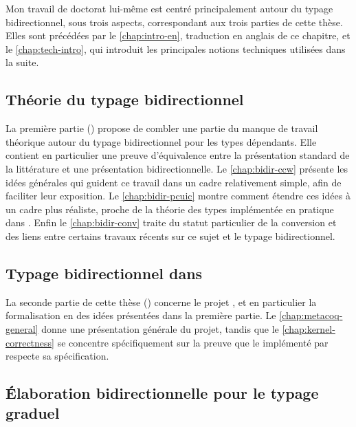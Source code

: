 Mon travail de doctorat lui-même
est centré principalement autour du typage bidirectionnel, sous
trois aspects, correspondant aux trois parties de cette thèse.
Elles sont précédées par le \cref{chap:intro-en}, traduction en anglais
de ce chapitre, et le \cref{chap:tech-intro}, qui introduit les principales
notions techniques utilisées dans la suite.

\subsection{Théorie du typage bidirectionnel}

La première partie () propose de combler une partie du
manque de travail théorique autour du typage bidirectionnel pour les types dépendants.
Elle contient en particulier une
preuve d’équivalence entre la présentation standard de la littérature
et une présentation bidirectionnelle.
Le \cref{chap:bidir-ccw} présente les idées générales qui guident ce travail
dans un cadre relativement simple, afin de faciliter leur exposition. 
Le \cref{chap:bidir-pcuic} montre comment étendre ces idées à un
cadre plus réaliste, proche de la théorie des types implémentée en pratique dans .
Enfin le \cref{chap:bidir-conv} traite du statut particulier de la
conversion
et des liens entre certains travaux récents sur ce sujet et le typage bidirectionnel.

\subsection{Typage bidirectionnel dans }

La seconde partie de cette thèse ()
concerne le projet ,
et en particulier la formalisation en  des idées présentées dans la
première partie. Le \cref{chap:metacoq-general} donne une présentation générale du
projet, tandis que le \cref{chap:kernel-correctness} se concentre spécifiquement
sur la preuve que le  implémenté par  respecte sa spécification.

\subsection{Élaboration bidirectionnelle pour le typage graduel}

